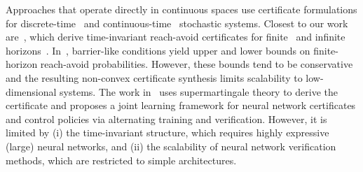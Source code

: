 \documentclass[journal,twoside,web]{ieeecolor}
\newcommand{\rv}[1]{\textcolor{blue}{#1}}
\theoremstyle{definition}
\theoremstyle{plain}
\theoremstyle{plain}
\begin{document}


Approaches that operate directly in continuous spaces use certificate formulations for discrete-time~\cite{vzikelic2023learning,xue2025finite} and continuous-time~\cite{neustroev2025neural} stochastic systems. 
Closest to our work are~\cite{xue2025finite,vzikelic2023learning}, which derive time-invariant reach-avoid certificates for finite~\cite{xue2025finite} and infinite horizons~\cite{vzikelic2023learning}.
% 
In~\cite{xue2025finite}, barrier-like conditions yield upper and lower bounds on finite-horizon reach-avoid probabilities. However, these bounds tend to be conservative and the resulting non-convex certificate synthesis limits scalability to low-dimensional systems. 
% 
The work in~\cite{vzikelic2023learning} uses supermartingale theory to derive the certificate and proposes a joint learning framework for neural network certificates and control policies via alternating training and verification. However, it is limited by (i) the time-invariant structure, which requires highly expressive (large) neural networks, and (ii) the scalability of neural network verification methods, which are restricted to simple architectures.
\end{document}

